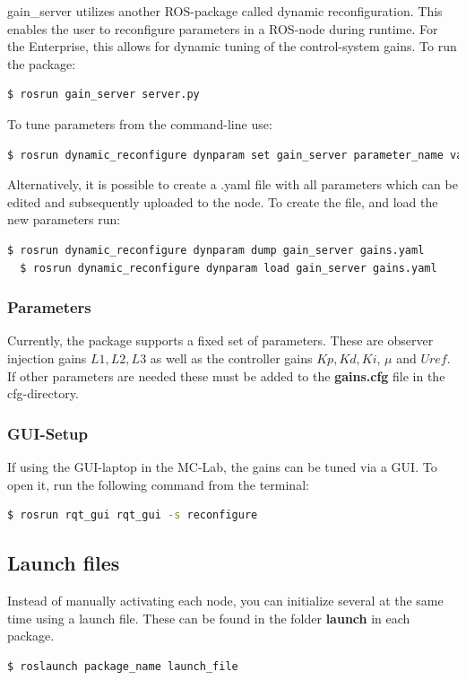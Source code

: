 gain\_server utilizes another ROS-package called dynamic reconfiguration. This enables the user to reconfigure parameters in a ROS-node during runtime. For the Enterprise, this allows for dynamic tuning of the control-system gains. To run the package: 

\begin{lstlisting}[language=bash,basicstyle=\mlttfamily, breaklines=true]
  $ rosrun gain_server server.py
\end{lstlisting}

To tune parameters from the command-line use: 

\begin{lstlisting}[language=bash,basicstyle=\mlttfamily, breaklines=true]
  $ rosrun dynamic_reconfigure dynparam set gain_server parameter_name value
\end{lstlisting}

Alternatively, it is possible to create a .yaml file with all parameters which can be edited and subsequently uploaded to the node. To create the file, and load the new parameters run: 

\begin{lstlisting}[language=bash,basicstyle=\mlttfamily, breaklines=true]
  $ rosrun dynamic_reconfigure dynparam dump gain_server gains.yaml
  $ rosrun dynamic_reconfigure dynparam load gain_server gains.yaml
\end{lstlisting}

\subsubsection{Parameters}

Currently, the package supports a fixed set of parameters. These are observer injection gains $L1, L2, L3$ as well as the controller gains $Kp, Kd, Ki$, $\mu$ and $Uref$. If other parameters are needed these must be added to the \textbf{gains.cfg} file in the cfg-directory. 

\subsubsection{GUI-Setup}

If using the GUI-laptop in the MC-Lab, the gains can be tuned via a GUI. To open it, run the following command from the terminal: 
\begin{lstlisting}[language=bash,basicstyle=\mlttfamily, breaklines=true]
  $ rosrun rqt_gui rqt_gui -s reconfigure
\end{lstlisting}

\subsection{Launch files}

Instead of manually activating each node, you can initialize several at the same time using a launch file. These can be found in the folder \textbf{launch} in each package. 

\begin{lstlisting}[language=bash,basicstyle=\mlttfamily, breaklines=true]
  $ roslaunch package_name launch_file
\end{lstlisting}